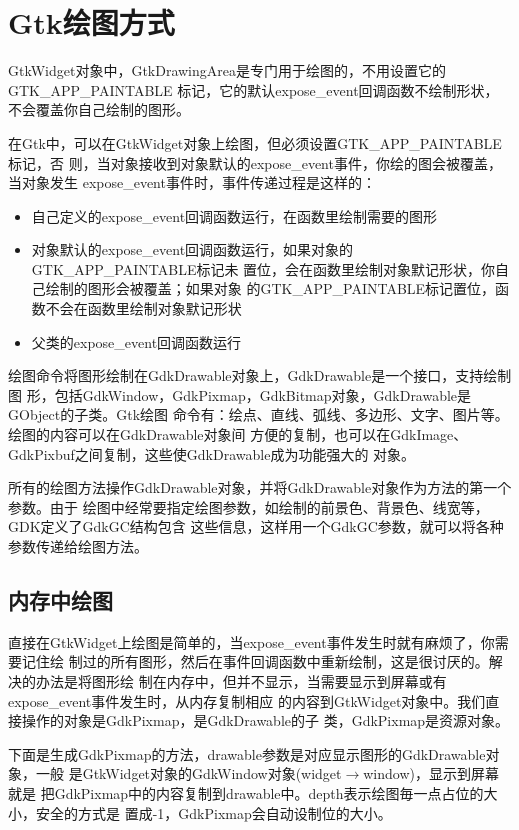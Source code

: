 

\section{Gtk绘图方式}

GtkWidget对象中，GtkDrawingArea是专门用于绘图的，不用设置它的GTK\_APP\_PAINTABLE
标记，它的默认expose\_event回调函数不绘制形状，不会覆盖你自己绘制的图形。

在Gtk中，可以在GtkWidget对象上绘图，但必须设置GTK\_APP\_PAINTABLE标记，否
则，当对象接收到对象默认的expose\_event事件，你绘的图会被覆盖，当对象发生
expose\_event事件时，事件传递过程是这样的：
\begin{itemize}
\item 自己定义的expose\_event回调函数运行，在函数里绘制需要的图形
\item 对象默认的expose\_event回调函数运行，如果对象的GTK\_APP\_PAINTABLE标记未
  置位，会在函数里绘制对象默记形状，你自己绘制的图形会被覆盖；如果对象
  的GTK\_APP\_PAINTABLE标记置位，函数不会在函数里绘制对象默记形状
\item 父类的expose\_event回调函数运行
\end{itemize}

绘图命令将图形绘制在GdkDrawable对象上，GdkDrawable是一个接口，支持绘制图
形，包括GdkWindow，GdkPixmap，GdkBitmap对象，GdkDrawable是GObject的子类。Gtk绘图
命令有：绘点、直线、弧线、多边形、文字、图片等。绘图的内容可以在GdkDrawable对象间
方便的复制，也可以在GdkImage、GdkPixbuf之间复制，这些使GdkDrawable成为功能强大的
对象。

所有的绘图方法操作GdkDrawable对象，并将GdkDrawable对象作为方法的第一个参数。由于
绘图中经常要指定绘图参数，如绘制的前景色、背景色、线宽等，GDK定义了GdkGC结构包含
这些信息，这样用一个GdkGC参数，就可以将各种参数传递给绘图方法。

\subsection{内存中绘图}

直接在GtkWidget上绘图是简单的，当expose\_event事件发生时就有麻烦了，你需要记住绘
制过的所有图形，然后在事件回调函数中重新绘制，这是很讨厌的。解决的办法是将图形绘
制在内存中，但并不显示，当需要显示到屏幕或有expose\_event事件发生时，从内存复制相应
的内容到GtkWidget对象中。我们直接操作的对象是GdkPixmap，是GdkDrawable的子
类，GdkPixmap是资源对象。

下面是生成GdkPixmap的方法，drawable参数是对应显示图形的GdkDrawable对象，一般
是GtkWidget对象的GdkWindow对象(widget$\rightarrow{}$window)，显示到屏幕就是
把GdkPixmap中的内容复制到drawable中。depth表示绘图毎一点占位的大小，安全的方式是
置成-1，GdkPixmap会自动设制位的大小。

